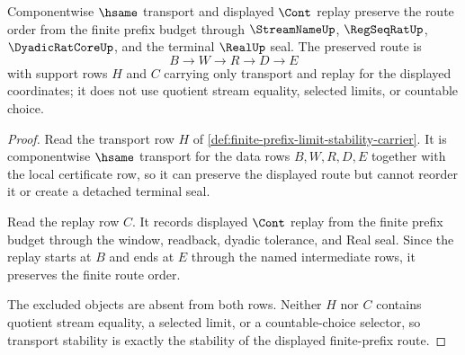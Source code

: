 \begin{theorem}
\label{thm:finite-prefix-limit-stability-transport-stability}
Componentwise $\hsame$ transport and displayed $\Cont$ replay preserve the route order from the finite prefix budget through $\StreamNameUp$, $\RegSeqRatUp$, $\DyadicRatCoreUp$, and the terminal $\RealUp$ seal. The preserved route is
$$
B \to W \to R \to D \to E
$$
with support rows $H$ and $C$ carrying only transport and replay for the displayed coordinates; it does not use quotient stream equality, selected limits, or countable choice.
\end{theorem}
\begin{proof}
Read the transport row $H$ of \autoref{def:finite-prefix-limit-stability-carrier}. It is componentwise $\hsame$ transport for the data rows $B,W,R,D,E$ together with the local certificate row, so it can preserve the displayed route but cannot reorder it or create a detached terminal seal.

Read the replay row $C$. It records displayed $\Cont$ replay from the finite prefix budget through the window, readback, dyadic tolerance, and Real seal. Since the replay starts at $B$ and ends at $E$ through the named intermediate rows, it preserves the finite route order.

The excluded objects are absent from both rows. Neither $H$ nor $C$ contains quotient stream equality, a selected limit, or a countable-choice selector, so transport stability is exactly the stability of the displayed finite-prefix route.
\end{proof}

